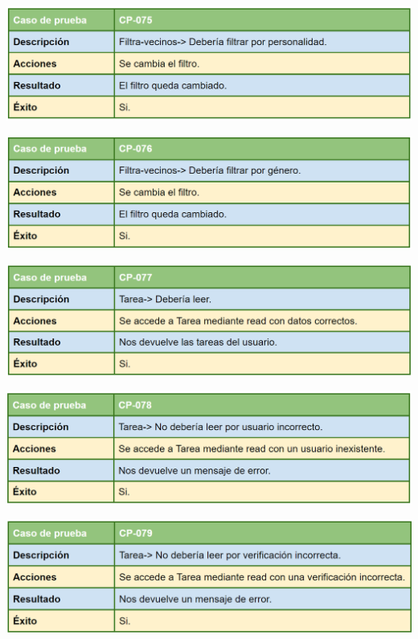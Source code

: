\bigskip

\includegraphics[width=\textwidth]{img/cap7/cp-075.png}

\bigskip

\includegraphics[width=\textwidth]{img/cap7/cp-076.png}

\bigskip

\includegraphics[width=\textwidth]{img/cap7/cp-077.png}

\bigskip

\includegraphics[width=\textwidth]{img/cap7/cp-078.png}

\bigskip

\includegraphics[width=\textwidth]{img/cap7/cp-079.png}

